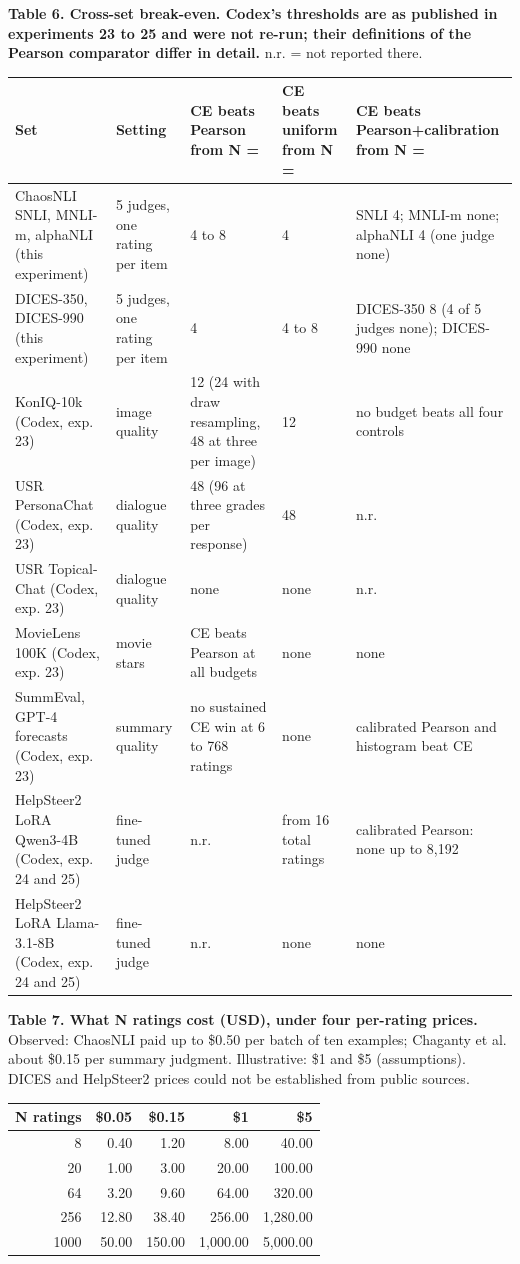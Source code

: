 \documentclass[10pt]{article}
\begin{document}
\textbf{Table 6. Cross-set break-even. Codex's thresholds are as published in experiments 23 to 25 and were not re-run; their definitions of the Pearson comparator differ in detail.} n.r. = not reported there.\par
\scriptsize
\begin{tabular}{p{2.1in}p{1.0in}p{1.4in}p{0.9in}p{1.4in}}\toprule
Set & Setting & CE beats Pearson from N = & CE beats uniform from N = & CE beats Pearson+calibration from N = \\ \midrule
ChaosNLI SNLI, MNLI-m, alphaNLI (this experiment) & 5 judges, one rating per item & 4 to 8 & 4 & SNLI 4; MNLI-m none; alphaNLI 4 (one judge none) \\
DICES-350, DICES-990 (this experiment) & 5 judges, one rating per item & 4 & 4 to 8 & DICES-350 8 (4 of 5 judges none); DICES-990 none \\
KonIQ-10k (Codex, exp. 23) & image quality & 12 (24 with draw resampling, 48 at three per image) & 12 & no budget beats all four controls \\
USR PersonaChat (Codex, exp. 23) & dialogue quality & 48 (96 at three grades per response) & 48 & n.r. \\
USR Topical-Chat (Codex, exp. 23) & dialogue quality & none & none & n.r. \\
MovieLens 100K (Codex, exp. 23) & movie stars & CE beats Pearson at all budgets & none & none \\
SummEval, GPT-4 forecasts (Codex, exp. 23) & summary quality & no sustained CE win at 6 to 768 ratings & none & calibrated Pearson and histogram beat CE \\
HelpSteer2 LoRA Qwen3-4B (Codex, exp. 24 and 25) & fine-tuned judge & n.r. & from 16 total ratings & calibrated Pearson: none up to 8,192 \\
HelpSteer2 LoRA Llama-3.1-8B (Codex, exp. 24 and 25) & fine-tuned judge & n.r. & none & none \\
\bottomrule\end{tabular}

\textbf{Table 7. What N ratings cost (USD), under four per-rating prices.} Observed: ChaosNLI paid up to \$0.50 per batch of ten examples; Chaganty et al. about \$0.15 per summary judgment. Illustrative: \$1 and \$5 (assumptions). DICES and HelpSteer2 prices could not be established from public sources.\par
\footnotesize
\begin{tabular}{rrrrr}\toprule
N ratings & \$0.05 & \$0.15 & \$1 & \$5 \\ \midrule
8 & 0.40 & 1.20 & 8.00 & 40.00 \\
20 & 1.00 & 3.00 & 20.00 & 100.00 \\
64 & 3.20 & 9.60 & 64.00 & 320.00 \\
256 & 12.80 & 38.40 & 256.00 & 1,280.00 \\
1000 & 50.00 & 150.00 & 1,000.00 & 5,000.00 \\
\bottomrule\end{tabular}
\end{document}
